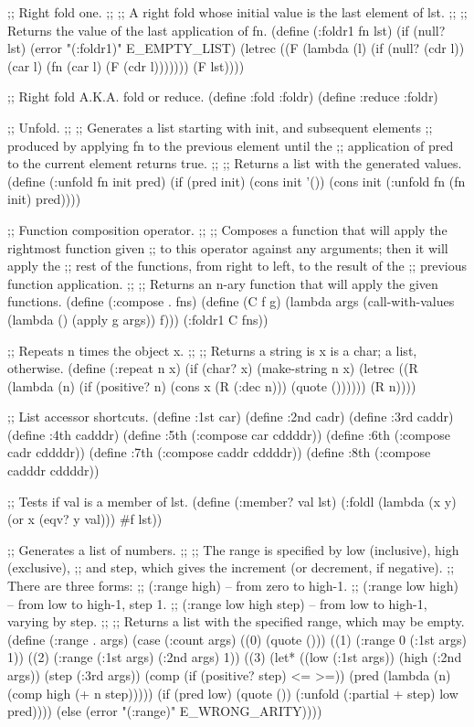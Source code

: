 ;; Right fold one.
;;
;; A right fold whose initial value is the last element of lst.
;;
;; Returns the value of the last application of fn.
(define (:foldr1 fn lst)
  (if (null? lst)
    (error "(:foldr1)" E_EMPTY_LIST)
    (letrec ((F (lambda (l)
                  (if (null? (cdr l)) 
                    (car l)
                    (fn (car l) (F (cdr l)))))))
      (F lst))))


;; Right fold A.K.A. fold or reduce.
(define :fold   :foldr)
(define :reduce :foldr)


;; Unfold.
;;
;; Generates a list starting with init, and subsequent elements
;; produced by applying fn to the previous element until the
;; application of pred to the current element returns true.
;;
;; Returns a list with the generated values.
(define (:unfold fn init pred)
  (if (pred init)
      (cons init '())
      (cons init (:unfold fn (fn init) pred))))


;; Function composition operator.
;;
;; Composes a function that will apply the rightmost function given
;; to this operator against any arguments; then it will apply the
;; rest of the functions, from right to left, to the result of the
;; previous function application.
;;
;; Returns an n-ary function that will apply the given functions.
(define (:compose . fns)
  (define (C f g)
    (lambda args
      (call-with-values (lambda () (apply g args)) f)))
  (:foldr1 C fns))


;; Repeats n times the object x.
;;
;; Returns a string is x is a char; a list, otherwise.
(define (:repeat n x)
  (if (char? x) 
    (make-string n x)
    (letrec ((R (lambda (n) 
                  (if (positive? n) 
                    (cons x (R (:dec n)))
                    (quote ())))))
      (R n))))


;; List accessor shortcuts.
(define :1st car)
(define :2nd cadr)
(define :3rd caddr)
(define :4th cadddr)
(define :5th (:compose car    cddddr))
(define :6th (:compose cadr   cddddr))
(define :7th (:compose caddr  cddddr))
(define :8th (:compose cadddr cddddr))


;; Tests if val is a member of lst.
(define (:member? val lst)
  (:foldl (lambda (x y) (or x (eqv? y val))) #f lst))


;; Generates a list of numbers.
;;
;; The range is specified by low (inclusive), high (exclusive),
;; and step, which gives the increment (or decrement, if negative).
;; There are three forms:
;; (:range high)          -- from zero to high-1.
;; (:range low high)      -- from low to high-1, step 1.
;; (:range low high step) -- from low to high-1, varying by step.
;;
;; Returns a list with the specified range, which may be empty.
(define (:range . args)
  (case (:count args)
    ((0) (quote ()))
    ((1) (:range 0 (:1st args) 1))
    ((2) (:range (:1st args) (:2nd args) 1))
    ((3) (let* ((low  (:1st args))
                (high (:2nd args))
                (step (:3rd args))
                (comp (if (positive? step) <= >=))
                (pred (lambda (n) (comp high (+ n step)))))
         (if (pred low)
           (quote ())
           (:unfold (:partial + step) low pred))))
    (else (error "(:range)" E_WRONG_ARITY))))


